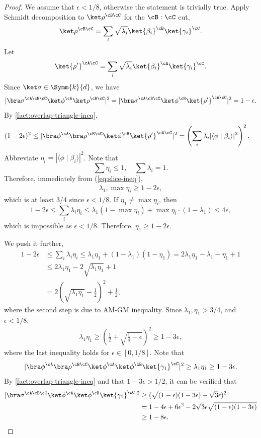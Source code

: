 \begin{proof}
We assume that $\epsilon<1/8$, otherwise the statement is trivially true.
Apply Schmidt decomposition to $\ket\rho^{\cB\cC}$ for the $\cB:\cC$ cut,
\[
    \ket\rho^{\cB\cC} = \sum_i \sqrt{\lambda_i} \ket{\beta_i}^\cB\ket{\gamma_i}^\cC.
\]
Let 
\[
    \ket{\rho'}^{\cA\cC}=\sum_i \sqrt{\lambda_i} \ket{\beta_i}^\cA\ket{\gamma_i}^\cC.
\]
Since $\ket\sigma\in\Symm{k}{d}$, we have
\[
    |
        \bra\sigma^{\cA\cB\cC} \ket\phi^\cA\ket\rho^{\cB\cC}|^2
    =
    |
        \bra\sigma^{\cA\cB\cC} \ket\phi^\cB\ket{\rho'}^{\cA\cC}
    |^2
    = 1- \epsilon.
\]
By \cref{fact:overlap-triangle-ineq},
\begin{align}
    (1-2\epsilon)^2
        &\le |\bra\phi^\cA\bra\rho^{\cB\cC} \ket\phi^\cB\ket{\rho'}^{\cA\cC}|^2
        = \left( \sum_i \lambda_i |\langle \phi\mid \beta_i \rangle|^2 \right)^2. \label{eq:slice-ineq}
\end{align}
Abbreviate $\eta_i = |\langle\phi\mid \beta_i \rangle|^2$. Note that
\[
    \sum \eta_i  \le 1, \quad \sum \lambda_i = 1.
\]
Therefore, immediately from (\ref{eq:slice-ineq}),  
\begin{align}
    \lambda_1, \max \eta_i \ge 1-2\epsilon,
\end{align}
which is at least 3/4 since $\epsilon<1/8$. If $\eta_1\not=\max\eta_i$, then 
\[
1-2\epsilon \le \sum_i \lambda_i \eta_i \le \lambda_1 (1-\max \eta_i) + \max \eta_i \cdot (1-\lambda_1) \le 4\epsilon,
\]
which is impossible as $\epsilon < 1/8$. Therefore, $\eta_1 \ge 1-2\epsilon$.

We push it further,
\begin{align}
    1-2\epsilon 
    &\le \sum_i \lambda_i \eta_i \le \lambda_1 \eta_1 + (1-\lambda_1)(1-\eta_1) = 2\lambda_1 \eta_1 -\lambda_1-\eta_1 +1
    \nonumber \\
    &\le 2\lambda_1\eta_1 -2\sqrt{\lambda_1\eta_1} +1
    \nonumber \\
    &=2 \left(\sqrt{\lambda_1 \eta_1 }-\frac{1}{2}\right)^2 + \frac{1}{2},
    \nonumber
\end{align}
where the second step is due to AM-GM inequality. Since $\lambda_1, \eta_1 > 3/4$, and $\epsilon<1/8$, 
\begin{align}
    \lambda_1\eta_1 \ge \left(\frac{1}{2}+\sqrt{\frac{1}{4}-\epsilon}\right)^2 \ge  1-3\epsilon,\nonumber
\end{align}
where the last inequality holds for $\epsilon\in[0,1/8]$. 
Note that
\[
 |\bra\phi^\cA\bra\rho^{\cB\cC} \ket\phi^\cA\ket\phi^\cB\ket{\gamma_1}^\cC|^2\ge\lambda_1\eta_1 \ge 1-3\epsilon.
\]
By \cref{fact:overlap-triangle-ineq} and that $1-3\epsilon > 1/2$, it can be verified that
\begin{align*}
    |\bra\sigma^{\cA\cB\cC} \ket\phi^\cA\ket\phi^\cB\ket{\gamma_1}^\cC|^2 
    &\ge (\sqrt{(1-\epsilon)(1-3\epsilon)}-\sqrt{3}\epsilon)^2
    \\
    &= 1-4\epsilon+6\epsilon^2 -2\sqrt{3}\epsilon\sqrt{(1-\epsilon)(1-3\epsilon)}
    \\
    &\ge 1-8\epsilon.\qedhere
\end{align*}
\end{proof}

